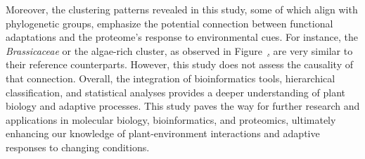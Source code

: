 Moreover, the clustering patterns revealed in this study, 
some of which align with phylogenetic groups, emphasize 
the potential connection between functional adaptations 
and the proteome's response to environmental cues. For 
instance, the \emph{Brassicaceae} or the algae-rich 
cluster, as observed in Figure~\href{fig:clustermap}, 
are very similar to their reference counterparts. However, 
this study does not assess the causality of that connection.
Overall, the integration of bioinformatics tools, 
hierarchical classification, and statistical analyses provides 
a deeper understanding of plant biology and adaptive processes. 
This study paves the way for further research and 
applications in molecular biology, bioinformatics, and 
proteomics, ultimately enhancing our knowledge of 
plant-environment interactions and adaptive responses to 
changing conditions.

